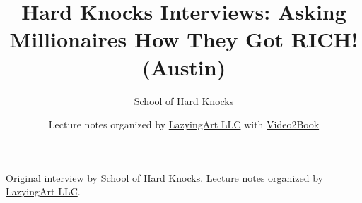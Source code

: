 \documentclass[11pt,oneside]{book}
\begin{document}
\frontmatter
\title{Hard Knocks Interviews: Asking Millionaires How They Got RICH! (Austin)}
\author{School of Hard Knocks}
\date{Lecture notes organized by \href{https://lazying.art}{LazyingArt LLC} with \href{https://github.com/lachlanchen/Video2Book}{Video2Book}}
\maketitle
\begin{center}
\small Original interview by School of Hard Knocks. Lecture notes organized by \href{https://lazying.art}{LazyingArt LLC}.
\end{center}
\clearpage
\mainmatter

\end{document}
